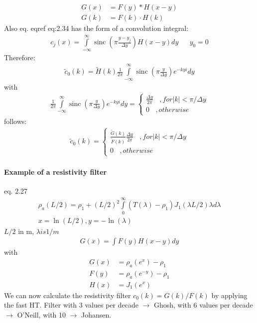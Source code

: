 \begin{align*}
G(x)&=F(y)\ast H(x-y)\\
G(k)&=F(k)\cdot H(k)
\end{align*}
Also eq. eqref eq:2.34 has the form of a convolution integral:
\begin{align*}
c_j(x)=\int\limits_{-\infty}^{\infty}\operatorname{sinc}\left(\pi\frac{y-y_j}{\Delta y}\right)H(x-y)dy && y_0=0
\end{align*}
Therefore:
\begin{align*}
\tilde{c}_0(k)=\tilde{H}(k)\frac{1}{2\pi}\int\limits_{-\infty}^{\infty}\operatorname{sinc}\left(\pi\frac{y}{\Delta y}\right)e^{-kyi}dy
\end{align*}
with 
\begin{align*}
\frac{1}{2\pi}\int\limits_{-\infty}^{\infty}\operatorname{sinc}\left(\pi\frac{y}{\Delta y}\right)e^{-kyi}dy=\begin{cases}
\frac{\Delta y}{2\pi}~~~~, for |k|<\pi/\Delta y\\
0 ~~~~, otherwise
\end{cases}
\end{align*}
follows:
\begin{align*}
\tilde{c}_0(k)=\begin{cases}
\frac{\tilde{G}(k)}{\tilde{F}(k)}\frac{\Delta y}{2\pi}~~~~, for |k|<\pi/\Delta y\\
0~~~~, otherwise
\end{cases}
\end{align*}


\paragraph{Example of a resistivity filter}
eq. 2.27
\begin{align*}
\rho_a(L/2)=\rho_1+(L/2)^2\int\limits_{0}^{\infty}(T(\lambda)-\rho_1)J_1(\lambda L/2)\lambda d\lambda\\
x=\ln(L/2), y=-\ln(\lambda)
\end{align*}
$L/2$ in m, $\lambda is 1/m$
\begin{align*}
G(x)=\int F(y) H(x-y)dy
\end{align*}
with
\begin{align*}
G(x)&=\rho_a(e^x)-\rho_1\\
F(y)&=\rho_a(e^{-y})-\rho_1\\
H(x)&=J_1(e^x)
\end{align*}
We can now calculate the resistivity filter $c_0(k)=G(k)/F(k)$ by applying the fast HT.
Filter with 3 values per decade $\rightarrow$ Ghosh, with 6 values per decade $\rightarrow$ O'Neill, with 10 $\rightarrow$ Johansen.

